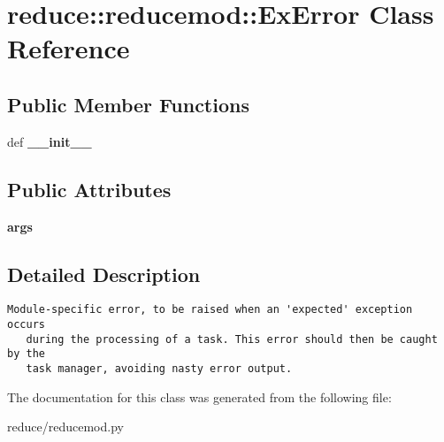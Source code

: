 \section{reduce::reducemod::Ex\-Error Class Reference}
\label{classreduce_1_1reducemod_1_1ExError}
\subsection*{Public Member Functions}
\begin{CompactItemize}
\item 
def \textbf{\_\-\_\-init\_\-\_\-}\label{classreduce_1_1reducemod_1_1ExError_0330672536e06b27cef962d3e0dafa4a}

\end{CompactItemize}
\subsection*{Public Attributes}
\begin{CompactItemize}
\item 
\textbf{args}\label{classreduce_1_1reducemod_1_1ExError_0b6c8c42abe094da494a9736530c0fe3}

\end{CompactItemize}


\subsection{Detailed Description}


\footnotesize\begin{verbatim}Module-specific error, to be raised when an 'expected' exception occurs
   during the processing of a task. This error should then be caught by the
   task manager, avoiding nasty error output.
\end{verbatim}
\normalsize
 



The documentation for this class was generated from the following file:\begin{CompactItemize}
\item 
reduce/reducemod.py\end{CompactItemize}
